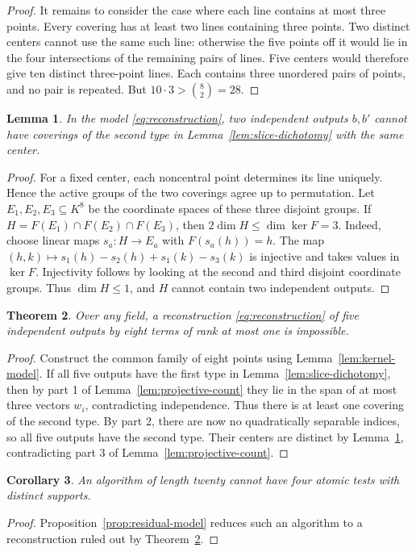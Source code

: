 \documentclass[11pt,a4paper]{article}
\numberwithin{equation}{section}
\theoremstyle{plain}
\newtheorem{theorem}{Theorem}[section]
\newtheorem{lemma}[theorem]{Lemma}
\newtheorem{cor}[theorem]{Corollary}
\theoremstyle{definition}
\newcommand{\leqs}{\leqslant}\newcommand{\geqs}{\geqslant}
\begin{document}
\begin{proof}
It remains to consider the case where each line contains at most
three points. Every covering has at least two lines containing three
points. Two distinct centers cannot use the same such line: otherwise
the five points off it would lie in the four intersections of the
remaining pairs of lines. Five centers would therefore give ten
distinct three-point lines. Each contains three unordered pairs of
points, and no pair is repeated. But $10\cdot3>\binom82=28$.
\end{proof}

\begin{lemma}\label{lem:same-center}
In the model \eqref{eq:reconstruction}, two independent outputs $b,b'$
cannot have coverings of the second type in
Lemma~\ref{lem:slice-dichotomy} with the same center.
\end{lemma}
\begin{proof}
For a fixed center, each noncentral point determines its line
uniquely. Hence the active groups of the two coverings agree up to
permutation. Let $E_1,E_2,E_3\subseteq K^8$ be the coordinate spaces
of these three disjoint groups. If
$H=F(E_1)\cap F(E_2)\cap F(E_3)$, then $2\dim H\leqs\dim\ker F=3$.
Indeed, choose linear maps $s_a:H\to E_a$ with $F(s_a(h))=h$.
The map $(h,k)\mapsto s_1(h)-s_2(h)+s_1(k)-s_3(k)$ is injective
and takes values in $\ker F$. Injectivity follows by looking at the
second and third disjoint coordinate groups.
Thus $\dim H\leqs1$, and $H$ cannot contain two independent outputs.
\end{proof}

\begin{theorem}\label{thm:no-eight}
Over any field, a reconstruction \eqref{eq:reconstruction} of five
independent outputs by eight terms of rank at most one is impossible.
\end{theorem}
\begin{proof}
Construct the common family of eight points using
Lemma~\ref{lem:kernel-model}. If all five outputs have the first type
in Lemma~\ref{lem:slice-dichotomy}, then by part 1 of
Lemma~\ref{lem:projective-count} they lie in the span of at most three
vectors $w_i$, contradicting independence.
Thus there is at least one covering of the second type.
By part 2, there are now no quadratically separable indices, so all
five outputs have the second type. Their centers are distinct by
Lemma~\ref{lem:same-center}, contradicting part 3 of
Lemma~\ref{lem:projective-count}.
\end{proof}

\begin{cor}\label{cor:no-four}
An algorithm of length twenty cannot have four atomic tests with
distinct supports.
\end{cor}
\begin{proof}
Proposition~\ref{prop:residual-model} reduces such an algorithm to a
reconstruction ruled out by Theorem~\ref{thm:no-eight}.
\end{proof}
\end{document}
